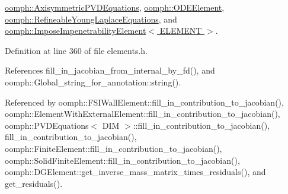 \hyperlink{classoomph_1_1AxisymmetricPVDEquations_a432b436b9e82c78cc06baefedc6029d4}{oomph\+::\+Axisymmetric\+P\+V\+D\+Equations}, \hyperlink{classoomph_1_1ODEElement_ab13351a18eee7d2ba455312ea755801f}{oomph\+::\+O\+D\+E\+Element}, \hyperlink{classoomph_1_1RefineableYoungLaplaceEquations_ae9a050a3b61cb89b54907a0efd9bcfab}{oomph\+::\+Refineable\+Young\+Laplace\+Equations}, and \hyperlink{classoomph_1_1ImposeImpenetrabilityElement_a1642298b1eca7806849324886672273e}{oomph\+::\+Impose\+Impenetrability\+Element$<$ E\+L\+E\+M\+E\+N\+T $>$}.



Definition at line 360 of file elements.\+h.



References fill\+\_\+in\+\_\+jacobian\+\_\+from\+\_\+internal\+\_\+by\+\_\+fd(), and oomph\+::\+Global\+\_\+string\+\_\+for\+\_\+annotation\+::string().



Referenced by oomph\+::\+F\+S\+I\+Wall\+Element\+::fill\+\_\+in\+\_\+contribution\+\_\+to\+\_\+jacobian(), oomph\+::\+Element\+With\+External\+Element\+::fill\+\_\+in\+\_\+contribution\+\_\+to\+\_\+jacobian(), oomph\+::\+P\+V\+D\+Equations$<$ D\+I\+M $>$\+::fill\+\_\+in\+\_\+contribution\+\_\+to\+\_\+jacobian(), fill\+\_\+in\+\_\+contribution\+\_\+to\+\_\+jacobian(), oomph\+::\+Finite\+Element\+::fill\+\_\+in\+\_\+contribution\+\_\+to\+\_\+jacobian(), oomph\+::\+Solid\+Finite\+Element\+::fill\+\_\+in\+\_\+contribution\+\_\+to\+\_\+jacobian(), oomph\+::\+D\+G\+Element\+::get\+\_\+inverse\+\_\+mass\+\_\+matrix\+\_\+times\+\_\+residuals(), and get\+\_\+residuals().

\mbox{\label{classoomph_1_1GeneralisedElement_a01ccf0a6a959cff46a36a4b7f1cf1554}} 
